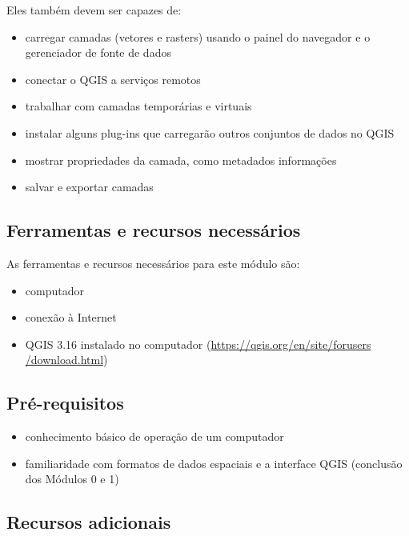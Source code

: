 \documentclass[
  portuguese,
]{krantz}
\providecommand{\tightlist}{%
  \setlength{\itemsep}{0pt}\setlength{\parskip}{0pt}}
\begin{document}
Eles também devem ser capazes de:

\begin{itemize}
\tightlist
\item
  carregar camadas (vetores e rasters) usando o painel do navegador e o gerenciador de fonte de dados
\item
  conectar o QGIS a serviços remotos
\item
  trabalhar com camadas temporárias e virtuais
\item
  instalar alguns plug-ins que carregarão outros conjuntos de dados no QGIS
\item
  mostrar propriedades da camada, como metadados informações
\item
  salvar e exportar camadas
\end{itemize}

\hypertarget{ferramentas-e-recursos-necessuxe1rios-2}{%
\subsection{Ferramentas e recursos necessários}\label{ferramentas-e-recursos-necessuxe1rios-2}}

As ferramentas e recursos necessários para este módulo são:

\begin{itemize}
\tightlist
\item
  computador
\item
  conexão à Internet
\item
  QGIS 3.16 instalado no computador (\href{https://qgis.org/en/site/forusers/download.html}{https://qgis.org/en/site/forusers /download.html})
\end{itemize}

\hypertarget{pruxe9-requisitos-2}{%
\subsection{Pré-requisitos}\label{pruxe9-requisitos-2}}

\begin{itemize}
\tightlist
\item
  conhecimento básico de operação de um computador
\item
  familiaridade com formatos de dados espaciais e a interface QGIS (conclusão dos Módulos 0 e 1)
\end{itemize}

\hypertarget{recursos-adicionais-2}{%
\subsection{Recursos adicionais}\label{recursos-adicionais-2}}
\end{document}
